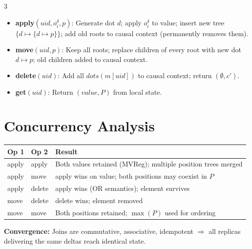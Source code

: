\documentclass[a0,portrait]{a0poster}
\begin{document}
\begin{multicols}{3}
\begin{itemize}
  \item \textbf{apply}$(uid,o^\delta_i,p)$: Generate dot $d$; apply $o^\delta_i$ to value; insert new tree $\{d\mapsto\{d\mapsto p\}\}$; add old roots to causal context (permanently removes them).
  \item \textbf{move}$(uid,p)$: Keep all roots; replace children of every root with new dot $d\mapsto p$; old children added to causal context.
  \item \textbf{delete}$(uid)$: Add all $dots(m[uid])$ to causal context; return $(\emptyset, c')$.
  \item \textbf{get}$(uid)$: Return $(value, P)$ from local state.
\end{itemize}


\section*{Concurrency Analysis}

\renewcommand{\arraystretch}{1.3}
\begin{tabularx}{\columnwidth}{@{}p{2.2cm}p{2.2cm}X@{}}
\toprule
\textbf{Op 1} & \textbf{Op 2} & \textbf{Result} \\
\midrule
apply & apply & Both values retained (MVReg); multiple position trees merged \\
apply & move & apply wins on value; both positions may coexist in $P$ \\
apply & delete & apply wins (OR semantics); element survives \\
move  & delete & delete wins; element removed \\
move  & move  & Both positions retained; $\max(P)$ used for ordering \\
\bottomrule
\end{tabularx}

\vspace{0.5em}
\textbf{Convergence:} Joins are commutative, associative, idempotent $\Rightarrow$ all replicas delivering the same deltas reach identical state.



\end{multicols}
\end{document}
